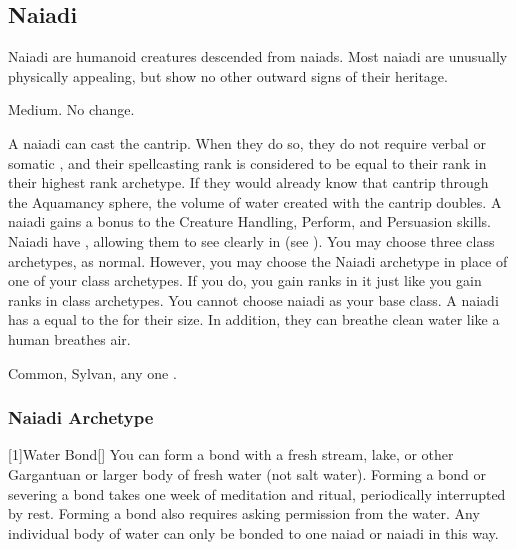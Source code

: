     \subsection{Naiadi}
        Naiadi are humanoid creatures descended from naiads.
        Most naiadi are unusually physically appealing, but show no other outward signs of their heritage.

         Medium.
         No change.
        \begin{itemize}
             A naiadi can cast the  cantrip.
                When they do so, they do not require verbal or somatic , and their spellcasting rank is considered to be equal to their rank in their highest rank archetype.
                If they would already know that cantrip through the Aquamancy sphere, the volume of water created with the cantrip doubles.
             A naiadi gains a  bonus to the Creature Handling, Perform, and Persuasion skills.
             Naiadi have , allowing them to see clearly in  (see ).
             You may choose three class archetypes, as normal.
                However, you may choose the Naiadi archetype in place of one of your class archetypes.
                If you do, you gain ranks in it just like you gain ranks in class archetypes.
                You cannot choose naiadi as your base class.
             A naiadi has a  equal to the  for their size.
                In addition, they can breathe clean water like a human breathes air.
        \end{itemize}
         Common, Sylvan, any one .

        \subsubsection{Naiadi Archetype}

            [1]{Water Bond}[\sparkle] You can form a bond with a fresh stream, lake, or other Gargantuan or larger body of fresh water (not salt water).
            Forming a bond or severing a bond takes one week of meditation and ritual, periodically interrupted by rest.
            Forming a bond also requires asking permission from the water.
            Any individual body of water can only be bonded to one naiad or naiadi in this way.

